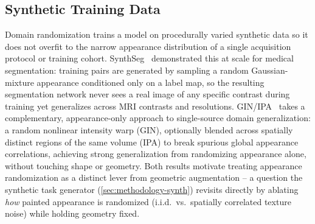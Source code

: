 \subsection{Synthetic Training Data}\label{sec:fundamentals-synthdata}

Domain randomization trains a model on procedurally varied synthetic data
so it does not overfit to the narrow appearance distribution of a single
acquisition protocol or training cohort. SynthSeg~\cite{billot2023synthseg}
demonstrated this at scale for medical segmentation: training pairs are
generated by sampling a random Gaussian-mixture appearance conditioned
only on a label map, so the resulting segmentation network never sees a
real image of any specific contrast during training yet generalizes
across MRI contrasts and resolutions. GIN/IPA~\cite{ouyang2022causality}
takes a complementary, appearance-only approach to single-source domain
generalization: a random nonlinear intensity warp (GIN), optionally
blended across spatially distinct regions of the same volume (IPA) to
break spurious global appearance correlations, achieving strong
generalization from randomizing appearance alone, without touching shape
or geometry. Both results motivate treating appearance randomization as a
distinct lever from geometric augmentation -- a question the synthetic
task generator (\autoref{sec:methodology-synth}) revisits directly by
ablating \emph{how} painted appearance is randomized (i.i.d.\ vs.\
spatially correlated texture noise) while holding geometry fixed.
